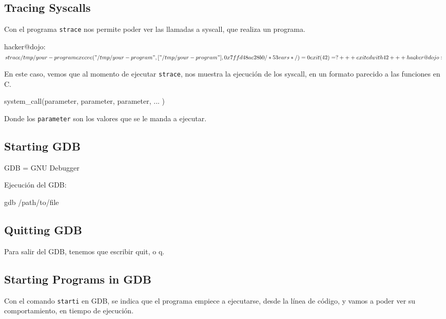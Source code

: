 \subsection{Tracing Syscalls}\label{subsec:tracing_syscalls}

Con el programa \texttt{strace} nos permite poder ver las llamadas a syscall, que
realiza un programa.

\begin{codebox}[bash]{}
	hacker@dojo:~$ strace /tmp/your-program
		execve("/tmp/your-program", ["/tmp/your-program"], 0x7ffd48ae28b0 /* 53 vars */) = 0
		exit(42)                                         = ?
		+++ exited with 42 +++
		hacker@dojo:~$
\end{codebox}

En este caso, vemos que al momento de ejecutar \texttt{strace}, nos muestra la
ejecución de los syscall, en un formato parecido a las funciones en C.

\begin{codebox}[C]{}
	system_call(parameter, parameter, parameter, ... )
\end{codebox}

Donde los \texttt{parameter} son los valores que se le manda a ejecutar.

\subsection{Starting GDB}\label{subsec:starting_gdb}

GDB = GNU Debugger

Ejecución del GDB:

\begin{codebox}[bash]{}
	gdb /path/to/file
\end{codebox}

\subsection{Quitting GDB}\label{subsec:quitting_gdb}

Para salir del GDB, tenemos que escribir quit, o q.

\subsection{Starting Programs in GDB}\label{subsec:starting_programs_in_gdb}

Con el comando \texttt{starti} en GDB, se indica que el programa empiece a ejecutarse,
desde la línea de código, y vamos a poder ver su comportamiento, en tiempo
de ejecución.

